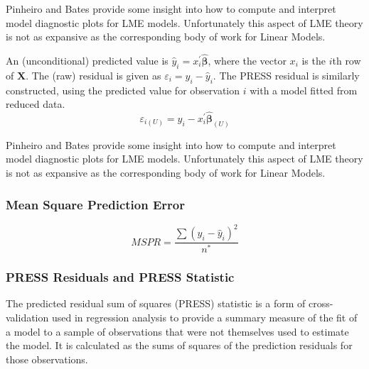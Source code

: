 \documentclass[12pt, a4paper]{report}
\theoremstyle{plain}
\theoremstyle{definition}
\theoremstyle{remark}
\begin{document}
	
	
	
	Pinheiro and Bates provide some insight into how to compute and interpret model diagnostic plots for LME models. Unfortunately this aspect of LME theory is not as expansive as the corresponding body of work for Linear Models.
	
	
	
	
	An (unconditional) predicted value is $\hat{y}_i = x^{\prime}_i \boldsymbol{\hat{\beta}}$, where
	the vector $x_i$ is the $i$th row of $\boldsymbol{X}$.
	The (raw) residual is given as $\varepsilon_i = y_i - \hat{y}_i$. The PRESS residual is
	similarly constructed, using the predicted value for observation $i$ with a model fitted from reduced data.
	\[ \varepsilon_{i(U)} = y_i - x^{\prime}_i \boldsymbol{\hat{\beta}}_{(U)} \]
	
	
	
	
	Pinheiro and Bates provide some insight into how to compute and interpret model diagnostic plots for LME models. Unfortunately this aspect of LME theory is not as expansive as the corresponding body of work for Linear Models.
	
	
	
	
	
	
	
	
	
	
	
	
	

	\subsubsection{Mean Square Prediction Error}
	\begin{equation}
	MSPR = \frac{\sum (y_{i}-\hat{y}_{i})^2}{n^*}
	\end{equation}
	
\subsubsection{PRESS Residuals and PRESS Statistic}
	The predicted residual sum of squares (PRESS) statistic is a form of cross-validation used in regression analysis to provide a summary measure of the fit of a model to a sample of observations that were not themselves used to estimate the model. It is calculated as the sums of squares of the prediction residuals for those observations.
	
\end{document}
